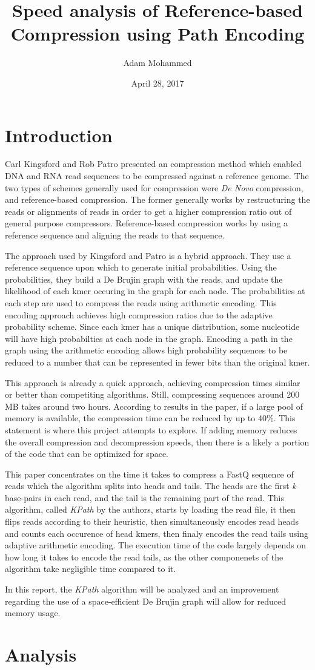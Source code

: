\documentclass[11pt]{article}
\title{Speed analysis of Reference-based Compression using Path Encoding}
\author{Adam Mohammed}
\date{April 28, 2017}
\begin{document}
\maketitle

\section{Introduction}
\label{sec:intro}

Carl Kingsford and Rob Patro presented an compression method which enabled DNA
and RNA read sequences to be compressed against a reference genome. The two
types of schemes generally used for compression were \textit{De Novo} compression, and
reference-based compression. The former generally works by restructuring the
reads or alignments of reads in order to get a higher compression ratio out of
general purpose compressors. Reference-based compression works by using a
reference sequence and aligning the reads to that sequence. 

The approach used by Kingsford and Patro is a hybrid approach. They use a
reference sequence upon which to generate initial probabilities. Using the
probabilities, they build a De Brujin graph with the reads, and update the
likelihood of each kmer occuring in the graph for each node. The probabilities
at each step are used to compress the reads using arithmetic encoding. This
encoding approach achieves high compression ratios due to the adaptive
probability scheme. Since each kmer has a unique distribution, some nucleotide
will have high probabilties at each node in the graph. Encoding a path in the
graph using the arithmetic encoding allows high probability sequences to be
reduced to a number that can be represented in fewer bits than the original
kmer. 

This approach is already a quick approach, achieving compression times similar
or better than competiting algorithms. Still, compressing sequences around 200
MB takes around two hours. According to results in the paper, if a large pool of
memory is available, the compression time can be reduced by up to 40\%. This
statement is where this project attempts to explore. If adding memory reduces
the overall compression and decompression speeds, then there is a likely a
portion of the code that can be optimized for space. 

This paper concentrates on the time it takes to compress a FastQ sequence of
reads which the algorithm splits into heads and tails. The heads are the first
\textit{k} base-pairs in each read, and the tail is the remaining part of the read.
This algorithm, called \textit{KPath} by the authors, starts by loading the read file,
it then flips reads according to their heuristic, then simultaneously encodes
read heads and counts each occurence of head kmers, then finaly encodes the read
tails using adaptive arithmetic encoding. The execution time of the code largely
depends on how long it takes to encode the read tails, as the other componenets
of the algorithm take negligible time compared to it.

In this report, the \textit{KPath} algorithm will be analyzed and an improvement
regarding the use of a space-efficient De Brujin graph will allow for reduced
memory usage. 

\section{Analysis}
\label{sec:analysis}
\end{document}
